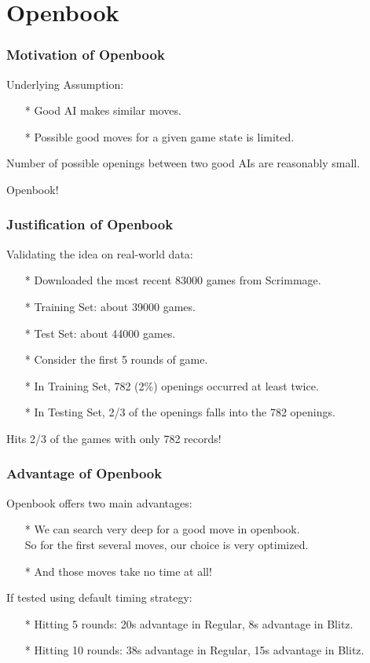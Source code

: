 \documentclass[10pt]{beamer}
\begin{document}
	\section{Openbook}
		\begin{frame}
		\frametitle{Motivation of Openbook}
		Underlying Assumption:
		\begin{itemize}
		\item[*] Good AI makes similar moves.
		\item[*] Possible good moves for a given game state is limited.
		\end{itemize}
		\pause
		Number of possible openings between two good AIs are reasonably small.

		Openbook!
	\end{frame}

	\begin{frame}
		\frametitle{Justification of Openbook}
		Validating the idea on real-world data:\pause
		\begin{itemize}
		\item[*] Downloaded the most recent 83000 games from Scrimmage.
		\item[*] Training Set: about 39000 games.
		\item[*] Test Set: about 44000 games.
		\pause
		\item[*] Consider the first \textcolor{dred}{5} rounds of game.
		\item[*] In Training Set, \textcolor{fgreen}{782} (\textcolor{fgreen}{2\%}) openings occurred at least \textcolor{fgreen}{twice}.
		\item[*] In Testing Set, \textcolor{fgreen}{2/3} of the openings falls into the 782 openings.
		\end{itemize}
		\pause
		Hits \textcolor{fgreen}{2/3} of the games with only \textcolor{fgreen}{782} records!
	\end{frame}

	\begin{frame}
		\frametitle{Advantage of Openbook}
		Openbook offers two main advantages:
		\begin{itemize}
		\item[*] We can search very deep for a good move in openbook.\\
		         So for the first several moves, our choice is very optimized.
		\item[*] And those moves take no time at all!
		\end{itemize}
		\pause
		If tested using default timing strategy:
		\begin{itemize}
		\item[*] Hitting \textcolor{fgreen}{5} rounds: \textcolor{fgreen}{20s} advantage in Regular, \textcolor{fgreen}{8s} advantage in Blitz.
		\item[*] Hitting \textcolor{fgreen}{10} rounds: \textcolor{fgreen}{38s} advantage in Regular, \textcolor{fgreen}{15s} advantage in Blitz.
		\end{itemize}
	\end{frame}
\end{document}
